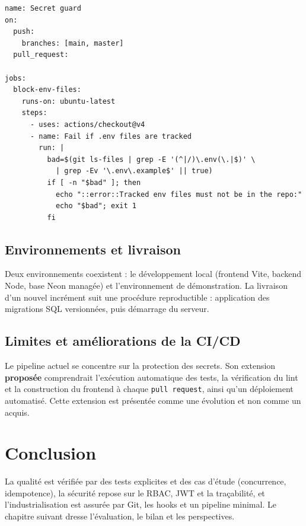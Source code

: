 \begin{lstlisting}[caption={Extrait du pipeline GitHub Actions « secret guard »},label={lst:ci}]
name: Secret guard
on:
  push:
    branches: [main, master]
  pull_request:

jobs:
  block-env-files:
    runs-on: ubuntu-latest
    steps:
      - uses: actions/checkout@v4
      - name: Fail if .env files are tracked
        run: |
          bad=$(git ls-files | grep -E '(^|/)\.env(\.|$)' \
            | grep -Ev '\.env\.example$' || true)
          if [ -n "$bad" ]; then
            echo "::error::Tracked env files must not be in the repo:"
            echo "$bad"; exit 1
          fi
\end{lstlisting}

\subsection{Environnements et livraison}

Deux environnements coexistent : le développement local (frontend Vite, backend Node, base Neon managée) et l'environnement de démonstration. La livraison d'un nouvel incrément suit une procédure reproductible : application des migrations SQL versionnées, puis démarrage du serveur.

\subsection{Limites et améliorations de la CI/CD}

Le pipeline actuel se concentre sur la protection des secrets. Son extension \textbf{proposée} comprendrait l'exécution automatique des tests, la vérification du lint et la construction du frontend à chaque \texttt{pull request}, ainsi qu'un déploiement automatisé. Cette extension est présentée comme une évolution et non comme un acquis.

\section{Conclusion}

La qualité est vérifiée par des tests explicites et des cas d'étude (concurrence, idempotence), la sécurité repose sur le RBAC, JWT et la traçabilité, et l'industrialisation est assurée par Git, les hooks et un pipeline minimal. Le chapitre suivant dresse l'évaluation, le bilan et les perspectives.
